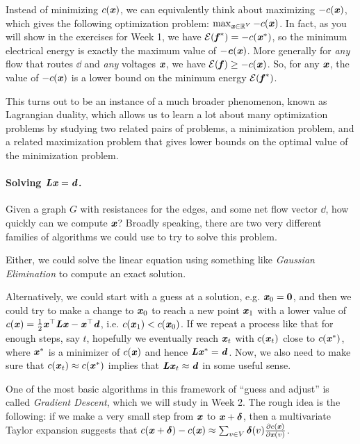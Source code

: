 Instead of minimizing $c(\boldsymbol{\mathit{x}})$, we can equivalently think about maximizing
$-c(\boldsymbol{\mathit{x}})$, which gives the following optimization problem: $\max_{\boldsymbol{\mathit{x}} \in \mathbb{R}^V} -c(\boldsymbol{\mathit{x}})$.
In fact, as you will show in the exercises for Week 1,
we have $\mathcal{E}(\boldsymbol{\mathit{f}}^*) = -c(\boldsymbol{\mathit{x}}^*)$, so the
minimum electrical energy is exactly the maximum value of
$-\boldsymbol{\mathit{c}}(\boldsymbol{\mathit{x}})$.
More generally for \emph{any} flow that routes $\dd$ and \emph{any}
voltages $\boldsymbol{\mathit{x}}$, we have $\mathcal{E}(\boldsymbol{\mathit{f}}) \geq -c(\boldsymbol{\mathit{x}})$.
So, for any $\boldsymbol{\mathit{x}}$, the value of $-c(\boldsymbol{\mathit{x}})$ is a lower bound on the
minimum energy $\mathcal{E}(\boldsymbol{\mathit{f}}^*)$.

This turns out to be an instance of a much broader phenomenon, known
as Lagrangian duality, which allows us to learn a lot about many
optimization problems by studying two related pairs of problems, a
minimization problem, and a related maximization problem that gives
lower bounds on the optimal value of the minimization problem.

\paragraph{Solving $\boldsymbol{\mathit{L}} \boldsymbol{\mathit{x}} = \boldsymbol{\mathit{d}}$.}
Given a graph $G$ with resistances for the edges, and some net flow
vector $\dd$, how quickly can we compute $\boldsymbol{\mathit{x}}$?
%
Broadly speaking, there are two very different families of algorithms
we could use to try to solve this problem.

Either, we could solve the linear equation using something like
\emph{Gaussian Elimination} to compute an exact solution.

Alternatively,
we could start with a guess at a solution, e.g. $\boldsymbol{\mathit{x}}_0
= \boldsymbol{0}$, and then we could try to make a change to $\boldsymbol{\mathit{x}}_0$ to reach
a new point $\boldsymbol{\mathit{x}}_1$ with a lower value of $c(\boldsymbol{\mathit{x}}) = \frac{1}{2} \boldsymbol{\mathit{x}}^{\top} \boldsymbol{\mathit{L}} \boldsymbol{\mathit{x}} -
\boldsymbol{\mathit{x}}^{\top}\boldsymbol{\mathit{d}}$, i.e. $c(\boldsymbol{\mathit{x}}_1) < c(\boldsymbol{\mathit{x}}_0)$.
If we repeat a process like that for enough steps, say $t$, hopefully we
eventually reach $\boldsymbol{\mathit{x}}_t$ with $c(\boldsymbol{\mathit{x}}_t)$ close to $c(\boldsymbol{\mathit{x}}^*)$, where
$\boldsymbol{\mathit{x}}^*$ is a minimizer of $c(\boldsymbol{\mathit{x}})$ and hence $\boldsymbol{\mathit{L}} \boldsymbol{\mathit{x}}^* = \boldsymbol{\mathit{d}}$.
Now, we also need to make sure that $c(\boldsymbol{\mathit{x}}_t) \approx c(\boldsymbol{\mathit{x}}^*)$
implies that $\boldsymbol{\mathit{L}} \boldsymbol{\mathit{x}}_t \approx \boldsymbol{\mathit{d}}$ in some useful sense.

One of the most basic algorithms in this framework of ``guess and adjust''
is called \emph{Gradient Descent}, which we will study in Week 2.
The rough idea is the following: if we make a very small step from $\boldsymbol{\mathit{x}}$ to
$\boldsymbol{\mathit{x}} + \boldsymbol{\delta}$, then a multivariate Taylor expansion suggests that
$c(\boldsymbol{\mathit{x}} + \boldsymbol{\delta}) - c(\boldsymbol{\mathit{x}}) \approx \sum_{v \in V} \boldsymbol{\delta}(v)
\frac{\partial c(\boldsymbol{\mathit{x}})}{\partial\boldsymbol{\mathit{x}}(v)} $.

